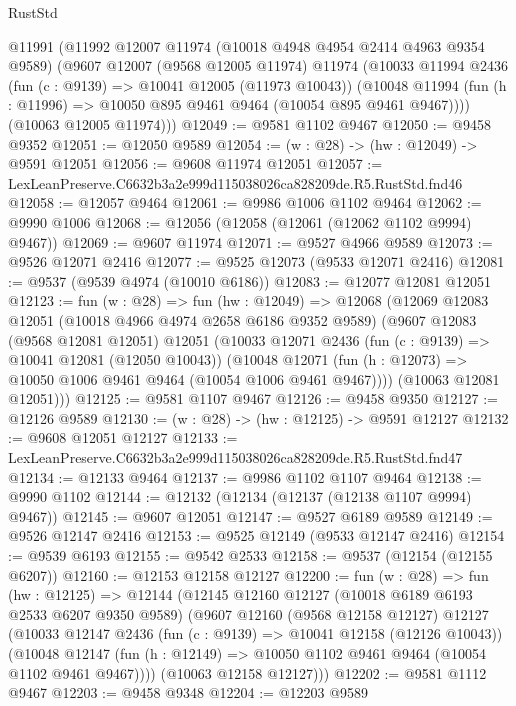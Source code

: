 \begin{lexlean}{RustStd}
\begin{coremodule}
  @11991
    (@11992
      @12007
      @11974
      (@10018 @4948 @4954 @2414 @4963 @9354 @9589)
      (@9607
        @12007
        (@9568 @12005 @11974)
        @11974
        (@10033
          @11994
          @2436
          (fun (c : @9139) => @10041 @12005 (@11973 @10043))
          (@10048 @11994 (fun (h : @11996) => @10050 @895 @9461 @9464 (@10054 @895 @9461 @9467))))
        (@10063 @12005 @11974)))
@12049 := @9581 @1102 @9467
@12050 := @9458 @9352
@12051 := @12050 @9589
@12054 := (w : @28) -> (hw : @12049) -> @9591 @12051
@12056 := @9608 @11974 @12051
@12057 := LexLeanPreserve.C6632b3a2e999d115038026ca828209de.R5.RustStd.fnd46
@12058 := @12057 @9464
@12061 := @9986 @1006 @1102 @9464
@12062 := @9990 @1006
@12068 := @12056 (@12058 (@12061 (@12062 @1102 @9994) @9467))
@12069 := @9607 @11974
@12071 := @9527 @4966 @9589
@12073 := @9526 @12071 @2416
@12077 := @9525 @12073 (@9533 @12071 @2416)
@12081 := @9537 (@9539 @4974 (@10010 @6186))
@12083 := @12077 @12081 @12051
@12123 := fun (w : @28) =>
  fun (hw : @12049) =>
  @12068
    (@12069
      @12083
      @12051
      (@10018 @4966 @4974 @2658 @6186 @9352 @9589)
      (@9607
        @12083
        (@9568 @12081 @12051)
        @12051
        (@10033
          @12071
          @2436
          (fun (c : @9139) => @10041 @12081 (@12050 @10043))
          (@10048 @12071 (fun (h : @12073) => @10050 @1006 @9461 @9464 (@10054 @1006 @9461 @9467))))
        (@10063 @12081 @12051)))
@12125 := @9581 @1107 @9467
@12126 := @9458 @9350
@12127 := @12126 @9589
@12130 := (w : @28) -> (hw : @12125) -> @9591 @12127
@12132 := @9608 @12051 @12127
@12133 := LexLeanPreserve.C6632b3a2e999d115038026ca828209de.R5.RustStd.fnd47
@12134 := @12133 @9464
@12137 := @9986 @1102 @1107 @9464
@12138 := @9990 @1102
@12144 := @12132 (@12134 (@12137 (@12138 @1107 @9994) @9467))
@12145 := @9607 @12051
@12147 := @9527 @6189 @9589
@12149 := @9526 @12147 @2416
@12153 := @9525 @12149 (@9533 @12147 @2416)
@12154 := @9539 @6193
@12155 := @9542 @2533
@12158 := @9537 (@12154 (@12155 @6207))
@12160 := @12153 @12158 @12127
@12200 := fun (w : @28) =>
  fun (hw : @12125) =>
  @12144
    (@12145
      @12160
      @12127
      (@10018 @6189 @6193 @2533 @6207 @9350 @9589)
      (@9607
        @12160
        (@9568 @12158 @12127)
        @12127
        (@10033
          @12147
          @2436
          (fun (c : @9139) => @10041 @12158 (@12126 @10043))
          (@10048 @12147 (fun (h : @12149) => @10050 @1102 @9461 @9464 (@10054 @1102 @9461 @9467))))
        (@10063 @12158 @12127)))
@12202 := @9581 @1112 @9467
@12203 := @9458 @9348
@12204 := @12203 @9589

\end{coremodule}
\end{lexlean}
